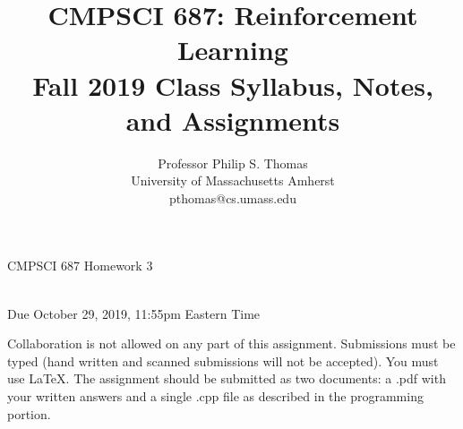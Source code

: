 \documentclass[]{article}
\title{CMPSCI 687: Reinforcement Learning\\Fall 2019 Class Syllabus, Notes, and Assignments}
\date{}
\author{Professor Philip S. Thomas\\University of Massachusetts Amherst\\pthomas@cs.umass.edu}
\begin{document}
\newpage
\begin{center}
    \begin{Large}
    CMPSCI 687 Homework 3
    \end{Large}
    \\
    Due October 29, 2019, 11:55pm Eastern Time
\end{center}

 Collaboration is not allowed on any part of this assignment. Submissions must be typed (hand written and scanned submissions will not be accepted). You must use \LaTeX. The assignment should be submitted as two documents: a .pdf with your written answers and a single .cpp file as described in the programming portion.
\\\\
\end{document}
